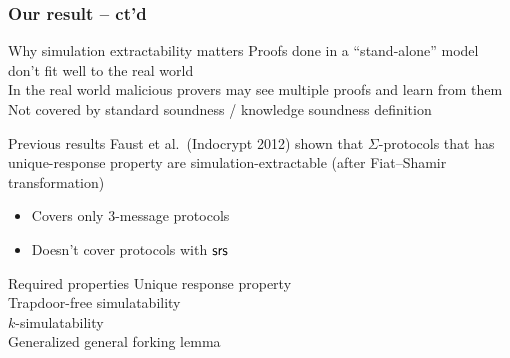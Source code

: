 \documentclass[aspectratio=169,handout]{beamer}
\begin{document}
\begin{frame}
  \frametitle{Our result -- ct'd}
    \begin{block}{Why simulation extractability matters}
      Proofs done in a ``stand-alone'' model don't fit well to the real world\\
      In the real world malicious provers may see multiple proofs and learn from
      them\\
      Not covered by standard soundness / knowledge soundness definition
    \end{block}
  
  \begin{block}{Previous results}
    Faust et al.~(Indocrypt 2012) shown that $\Sigma$-protocols that has
    unique-response property are simulation-extractable (after Fiat--Shamir
    transformation)
    \begin{itemize}
    \item Covers only $3$-message protocols
    \item Doesn't cover protocols with $\mathsf{srs}$
    \end{itemize}
  \end{block}

  \begin{block}{Required properties}
    Unique response property\\
    Trapdoor-free simulatability\\
    $k$-simulatability\\
    Generalized general forking lemma
  \end{block}
\end{frame}
\end{document}
